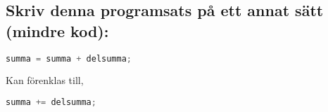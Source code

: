 \documentclass[../main.tex]{subfiles}
\begin{document}
\subsection{Skriv denna programsats på ett annat sätt (mindre kod):}

\begin{lstlisting}[language=java]
summa = summa + delsumma;
\end{lstlisting}
Kan förenklas till,
\begin{lstlisting}[language=java]
summa += delsumma;
\end{lstlisting}
\end{document}
